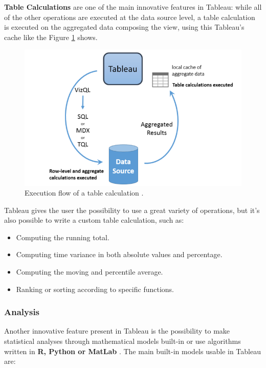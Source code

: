 \textbf{Table Calculations} are one of the main innovative features in Tableau: while all of the other operations are executed at the data source level, a table calculation is executed on the aggregated data composing the view, using this Tableau's cache like the Figure \ref{fig:TableCalculation} shows.


\begin{figure}[ht]
    \begin{center}
        \includegraphics[width=0.8\linewidth]{Figures/TableCalculation.png}
    \end{center}
    \caption{Execution flow of a table calculation \protect\cite{LearningTableau}.}
    \label{fig:TableCalculation}
\end{figure}

Tableau gives the user the possibility to use a great variety of operations, but it's also possible to write a custom table calculation, such as:

\begin{itemize}
    \item Computing the running total.
    \item Computing time variance in both absolute values and percentage.
    \item Computing the moving and percentile average.
    \item Ranking or sorting according to specific functions.
\end{itemize}

\subsubsection{Analysis}

Another innovative feature present in Tableau is the possibility to make statistical analyses through mathematical models built-in or use algorithms written in \textbf{R, Python or MatLab} \cite{LearningTableau}. The main built-in models usable in Tableau are:

